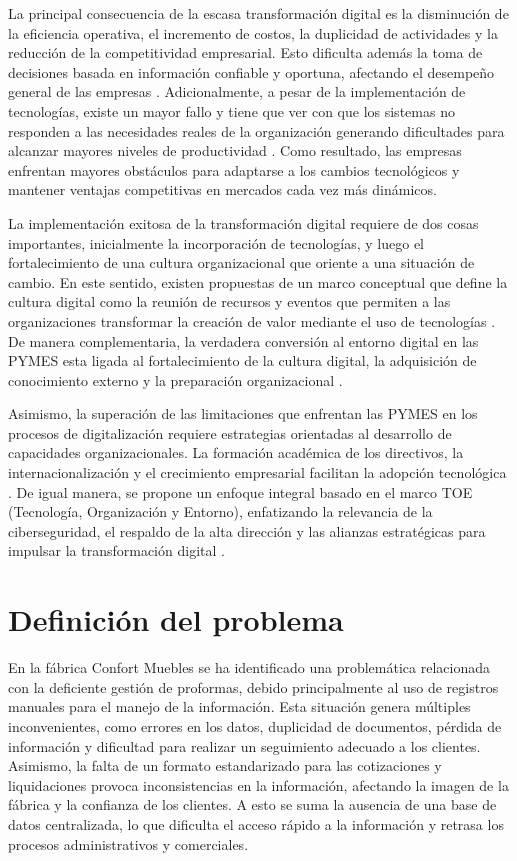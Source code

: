 La principal consecuencia de la escasa transformación digital es la disminución de la eficiencia operativa, el incremento de costos, la duplicidad de actividades y la reducción de la competitividad empresarial. Esto dificulta además la toma de decisiones basada en información confiable y oportuna, afectando el desempeño general de las empresas \parencite{quispe2025}. Adicionalmente, a pesar de la implementación de tecnologías, existe un mayor fallo y tiene que ver con que los sistemas no responden a las necesidades reales de la organización generando dificultades para alcanzar mayores niveles de productividad \parencite{munoz2023}. Como resultado, las empresas enfrentan mayores obstáculos para adaptarse a los cambios tecnológicos y mantener ventajas competitivas en mercados cada vez más dinámicos.

La implementación exitosa de la transformación digital requiere de dos cosas importantes, inicialmente la incorporación de tecnologías, y luego el fortalecimiento de una cultura organizacional que oriente a una situación de cambio. En este sentido, existen propuestas de un marco conceptual que define la cultura digital como la reunión de recursos y eventos que permiten a las organizaciones transformar la creación de valor mediante el uso de tecnologías \parencite{grover2022}. De manera complementaria,  la verdadera conversión al entorno digital en las PYMES esta ligada al fortalecimiento de la cultura digital, la adquisición de conocimiento externo y la preparación organizacional \parencite{jewapatarakul2024}.

Asimismo, la superación de las limitaciones que enfrentan las PYMES en los procesos de digitalización requiere estrategias orientadas al desarrollo de capacidades organizacionales. La formación académica de los directivos, la internacionalización y el crecimiento empresarial facilitan la adopción tecnológica \parencite{clemente2024}. De igual manera, se propone un enfoque integral basado en el marco TOE (Tecnología, Organización y Entorno), enfatizando la relevancia de la ciberseguridad, el respaldo de la alta dirección y las alianzas estratégicas para impulsar la transformación digital \parencite{hoang2024}.

\section{Definición del problema}

En la fábrica Confort Muebles se ha identificado una problemática relacionada con la deficiente gestión de proformas, debido principalmente al uso de registros manuales para el manejo de la información. Esta situación genera múltiples inconvenientes, como errores en los datos, duplicidad de documentos, pérdida de información y dificultad para realizar un seguimiento adecuado a los clientes. Asimismo, la falta de un formato estandarizado para las cotizaciones y liquidaciones provoca inconsistencias en la información, afectando la imagen de la fábrica y la confianza de los clientes. A esto se suma la ausencia de una base de datos centralizada, lo que dificulta el acceso rápido a la información y retrasa los procesos administrativos y comerciales.

